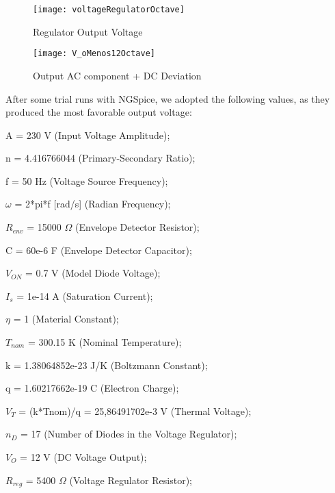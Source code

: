 \FloatBarrier
\begin{figure}[h] \centering
	\texttt{[image: voltageRegulatorOctave]}
	\caption{Regulator Output Voltage}
	\label{fig:vO_Final}
\end{figure}
\FloatBarrier

\FloatBarrier
\begin{figure}[h] \centering
	\texttt{[image: V\_oMenos12Octave]}
	\caption{Output AC component + DC Deviation}
\label{fig:vO_Ripple}
\end{figure}
\FloatBarrier

After some trial runs with NGSpice, we adopted the following values, as they produced the most favorable output voltage:

A = 230 V (Input Voltage Amplitude);

n = 4.416766044 (Primary-Secondary Ratio);

f = 50 Hz (Voltage Source Frequency);

$\omega$ = 2*pi*f [rad/s] (Radian Frequency);

$R_{env}$ = 15000 $\Omega$ (Envelope Detector Resistor);

C = 60e-6 F (Envelope Detector Capacitor);

$V_{ON}$ = 0.7 V (Model Diode Voltage);

$I_s$ = 1e-14 A (Saturation Current);

$\eta$ = 1 (Material Constant);

$T_{nom}$ = 300.15 K (Nominal Temperature);

k = 1.38064852e-23 J/K (Boltzmann Constant);

q = 1.60217662e-19 C (Electron Charge);

$V_T$ = (k*Tnom)/q = 25,86491702e-3 V (Thermal Voltage);

$n_D$ = 17 (Number of Diodes in the Voltage Regulator);

$V_O$ = 12 V (DC Voltage Output);

$R_{reg}$ = 5400 $\Omega$ (Voltage Regulator Resistor);